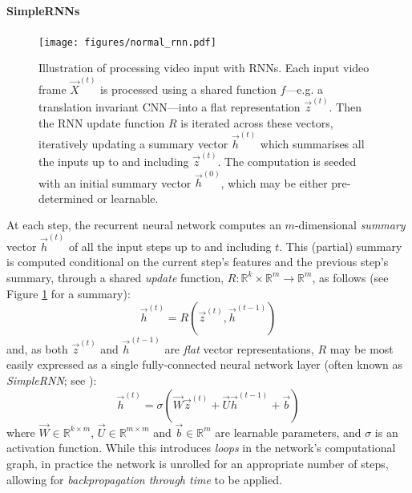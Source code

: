 \paragraph{SimpleRNNs}
\begin{figure}
    \centering
    \texttt{[image: figures/normal\_rnn.pdf]}
    \caption{Illustration of processing video input with RNNs. Each input video frame $\vec{X}^{(t)}$ is processed using a shared function $f$---e.g. a translation invariant CNN---into a flat representation $\vec{z}^{(t)}$. Then the RNN update function $R$ is iterated across these vectors, iteratively updating a summary vector $\vec{h}^{(t)}$ which summarises all the inputs up to and including $\vec{z}^{(t)}$. The computation is seeded with an initial summary vector $\vec{h}^{(0)}$, which may be either pre-determined or learnable.}
    \label{fig:normal_rnn}
\end{figure}
At each step, the recurrent neural network computes an $m$-dimensional \emph{summary} vector $\vec{h}^{(t)}$ of all the input steps up to and
including $t$. This (partial) summary is computed conditional on the current step's
features and the previous step's summary, through a shared \emph{update} function, $R : \mathbb{R}^k \times \mathbb{R}^m \rightarrow \mathbb{R}^m$, as follows (see Figure \ref{fig:normal_rnn} for a summary):
\begin{equation}\label{eqn:rnn_upd}
    \vec{h}^{(t)} = R(\vec{z}^{(t)}, \vec{h}^{(t-1)})
\end{equation}
and, as both $\vec{z}^{(t)}$ and $\vec{h}^{(t-1)}$ are \emph{flat} vector representations, $R$ may be most easily expressed as a single fully-connected neural network layer (often known as \emph{SimpleRNN}; see \citet{elman1990finding,jordan1997serial}):
\begin{equation}\label{eqn:SimpleRNN}
     \vec{h}^{(t)} = \sigma(\vec{W}\vec{z}^{(t)} + \vec{U}\vec{h}^{(t-1)} + \vec{b})
\end{equation}
where $\vec{W}\in\mathbb{R}^{k\times m}$, $\vec{U}\in\mathbb{R}^{m\times m}$ and $\vec{b}\in\mathbb{R}^m$ are learnable parameters, and $\sigma$ is an activation function. While this introduces \emph{loops} in the network's computational graph, in practice
the network is unrolled for an appropriate number of steps, allowing for \emph{backpropagation through time} \citep{robinson1987utility,werbos1988generalization,mozer1989focused} to be applied.

